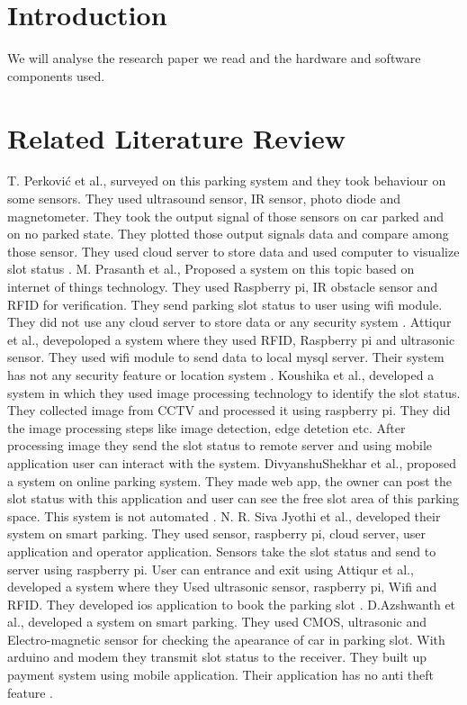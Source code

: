 \section{Introduction}
We will analyse the research paper we read and the hardware and software components used.
\section{Related Literature Review}
T. Perković et al., surveyed on this parking system and they took behaviour on some sensors. They used ultrasound sensor, IR sensor, photo diode and magnetometer. They took the output signal of those sensors on car parked and on no parked state. They plotted those output signals data and compare among those sensor. They used cloud server to store data and used computer to visualize slot status \cite{PERKOVIC2020121181}. M. Prasanth et al., Proposed a system on this topic based on internet of things technology. They used Raspberry pi, IR obstacle sensor and RFID for verification. They send parking slot status to user using wifi module. They did not use any cloud server to store data or any security system \cite{prasanth12design}.
Attiqur et al., devepoloped a system where they used RFID, Raspberry pi and ultrasonic sensor. They used wifi module to send data to local mysql server. Their system has not any security feature or location system \cite{atiqursmart}. 
Koushika et al., developed a system in which they used image processing technology to identify the slot status. They collected image from CCTV and processed it using raspberry pi. They did the image processing steps like image detection, edge detetion etc. After processing image they send the slot status to remote server and using mobile application user can interact with the system. \cite{koushika2021efficient}
DivyanshuShekhar et al., proposed a system on online parking system. They made web app, the owner can post the slot status with this application and user can see the free slot area of this parking space. This system is not automated \cite{divyanshushekhar2021parkofy}. 
N. R. Siva Jyothi et al., developed their system on smart parking. They used sensor, raspberry pi, cloud server, user application and operator application. Sensors take the slot status and send to server using raspberry pi. User can entrance and exit using \cite{jyothireal}
Attiqur et al., developed a system where they Used ultrasonic sensor, raspberry pi, Wifi and RFID. They developed ios application to book the parking slot \cite{atiqur2020automated}. 
D.Azshwanth et al., developed a system on smart parking. They used CMOS, ultrasonic and Electro-magnetic sensor for checking the apearance of car in parking slot. With arduino and modem they transmit slot status to the receiver. They built up payment system using mobile application. Their application has no anti theft feature \cite{azshwanth2019automated}.
